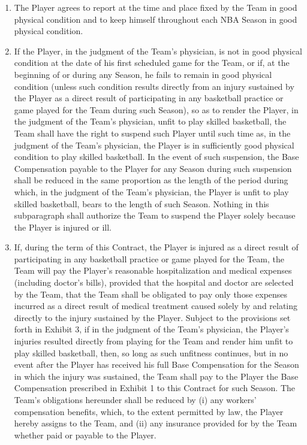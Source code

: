 \documentclass[
]{book}
\providecommand{\tightlist}{%
  \setlength{\itemsep}{0pt}\setlength{\parskip}{0pt}}
\begin{document}
\begin{enumerate}
\def\labelenumi{(\alph{enumi})}
\tightlist
\item
  The Player agrees to report at the time and place fixed by the Team in good physical condition and to keep himself throughout each NBA Season in good physical condition.
\item
  If the Player, in the judgment of the Team's physician, is not in good physical condition at the date of his first scheduled game for the Team, or if, at the beginning of or during any Season, he fails to remain in good physical condition (unless such condition results directly from an injury sustained by the Player as a direct result of participating in any basketball practice or game played for the Team during such Season), so as to render the Player, in the judgment of the Team's physician, unfit to play skilled basketball, the Team shall have the right to suspend such Player until such time as, in the judgment of the Team's physician, the Player is in sufficiently good physical condition to play skilled basketball. In the event of such suspension, the Base Compensation payable to the Player for any Season during such suspension shall be reduced in the same proportion as the length of the period during which, in the judgment of the Team's physician, the Player is unfit to play skilled basketball, bears to the length of such Season. Nothing in this subparagraph shall authorize the Team to suspend the Player solely because the Player is injured or ill.
\item
  If, during the term of this Contract, the Player is injured as a direct result of participating in any basketball practice or game played for the Team, the Team will pay the Player's reasonable hospitalization and medical expenses (including doctor's bills), provided that the hospital and doctor are selected by the Team, that the Team shall be obligated to pay only those expenses incurred as a direct result of medical treatment caused solely by and relating directly to the injury sustained by the Player. Subject to the provisions set forth in Exhibit 3, if in the judgment of the Team's physician, the Player's injuries resulted directly from playing for the Team and render him unfit to play skilled basketball, then, so long as such unfitness continues, but in no event after the Player has received his full Base Compensation for the Season in which the injury was sustained, the Team shall pay to the Player the Base Compensation prescribed in Exhibit 1 to this Contract for such Season. The Team's obligations hereunder shall be reduced by (i) any workers' compensation benefits, which, to the extent permitted by law, the Player hereby assigns to the Team, and (ii) any insurance provided for by the Team whether paid or payable to the Player.

\end{enumerate}
\end{document}
